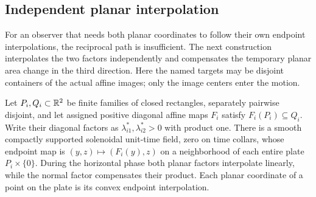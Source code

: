 \subsection{Independent planar interpolation}

For an observer that needs both planar coordinates to follow their own
endpoint interpolations, the reciprocal path is insufficient. The next
construction interpolates the two factors independently and compensates
the temporary planar area change in the third direction. Here the named
targets may be disjoint containers of the actual affine images; only the
image centers enter the motion.

\begin{lemma}
\label{ba:plate-routing}
Let $P_i,Q_i\subset\mathbb R^2$ be finite families of closed rectangles,
separately pairwise disjoint, and let assigned positive diagonal affine
maps $F_i$ satisfy $F_i(P_i)\subseteq Q_i$. Write their diagonal factors as
$\lambda_{i1}^*,\lambda_{i2}^*>0$ with product one.
There is a smooth compactly supported solenoidal unit-time field, zero on
time collars, whose endpoint map is $(y,z)\mapsto(F_i(y),z)$ on a
neighborhood of each entire plate $P_i\times\{0\}$. During the horizontal
phase both planar factors interpolate linearly, while the normal factor
compensates their product. Each planar coordinate of a point on the plate
is its convex endpoint interpolation.
\end{lemma}
